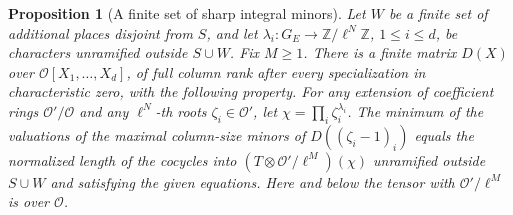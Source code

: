 \documentclass[a4paper,11pt]{article}
\newtheorem{proposition}{Proposition}[section]
\theoremstyle{definition}
\theoremstyle{remark}
\newcommand{\ZZ}{\mathbb Z}\newcommand{\ord}{\operatorname{ord}}
\numberwithin{equation}{section}
\begin{document}
\begin{proposition}[A finite set of sharp integral minors]\leavevmode
\label{prop:sharpminors727}
Let \(W\) be a finite set of additional places disjoint from \(S\),
and let \(\lambda_i:G_E\to\ZZ/\ell^N\ZZ\), \(1\le i\le d\), be
characters unramified outside \(S\cup W\). Fix \(M\ge1\).
There is a finite matrix \(D(X)\) over
\(\mathcal O[X_1,\ldots,X_d]\), of full column rank after every
specialization in characteristic zero, with the following property.
For any extension of coefficient rings \(\mathcal O'/\mathcal O\) and
any \(\ell^N\)-th roots \(\zeta_i\in\mathcal O'\), let
\(\chi=\prod_i\zeta_i^{\lambda_i}\). The minimum of the valuations
of the maximal column-size minors of \(D((\zeta_i-1)_i)\) equals the
normalized length of the cocycles into \((T\otimes\mathcal O'/\ell^M)(\chi)\)
unramified outside \(S\cup W\) and satisfying the given equations.
Here and below the tensor with \(\mathcal O'/\ell^M\) is over \(\mathcal O\).
\end{proposition}
\end{document}

